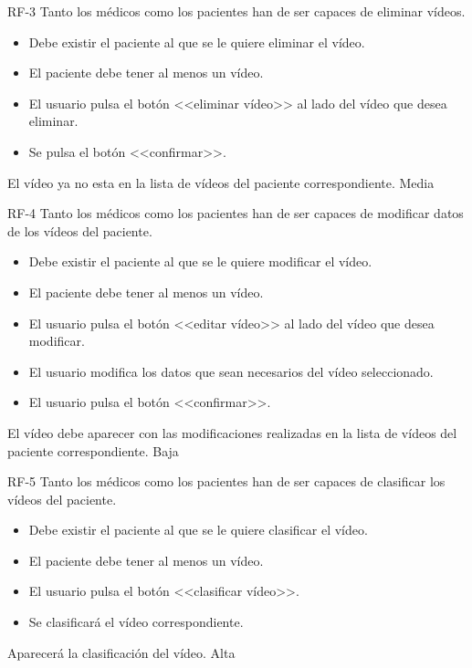 {RF-3}
{Tanto los médicos como los pacientes han de ser capaces de eliminar vídeos.}
{	\begin{itemize}
	\def\labelenumi{\arabic{enumi}.}
	\tightlist
	\item Debe existir el paciente al que se le quiere eliminar el vídeo.
	\item El paciente debe tener al menos un vídeo.
	\end{itemize}}
{
	\begin{itemize}
	\def\labelenumi{\arabic{enumi}.}
	\tightlist

    \item El usuario pulsa el botón <<eliminar vídeo>> al lado del vídeo que desea eliminar.
    \item Se pulsa el botón <<confirmar>>.
    \end{itemize}
}
{El vídeo ya no esta en la lista de vídeos del paciente correspondiente.}
{}
{Media}

{RF-4}
{Tanto los médicos como los pacientes han de ser capaces de modificar datos de los vídeos del paciente.}
{	\begin{itemize}
	\def\labelenumi{\arabic{enumi}.}
	\tightlist
	\item Debe existir el paciente al que se le quiere modificar el vídeo.
	\item El paciente debe tener al menos un vídeo.
	\end{itemize}}
{
	\begin{itemize}
	\def\labelenumi{\arabic{enumi}.}
	\tightlist

    \item El usuario pulsa el botón <<editar vídeo>> al lado del vídeo que desea modificar.
    \item El usuario modifica los datos que sean necesarios del vídeo seleccionado.
    \item El usuario pulsa el botón <<confirmar>>.
    
    \end{itemize}
}
{El vídeo debe aparecer con las modificaciones realizadas en la lista de vídeos del paciente correspondiente.}
{}
{Baja}

{RF-5}
{Tanto los médicos como los pacientes han de ser capaces de clasificar los vídeos del paciente.}
{	\begin{itemize}
	\def\labelenumi{\arabic{enumi}.}
	\tightlist
	\item Debe existir el paciente al que se le quiere clasificar el vídeo.
	\item El paciente debe tener al menos un vídeo.
	\end{itemize}}
{
	\begin{itemize}
	\def\labelenumi{\arabic{enumi}.}
	\tightlist

    \item El usuario pulsa el botón <<clasificar vídeo>>.
    \item Se clasificará el vídeo correspondiente.

    
    \end{itemize}
}
{Aparecerá la clasificación del vídeo.}
{}
{Alta}


